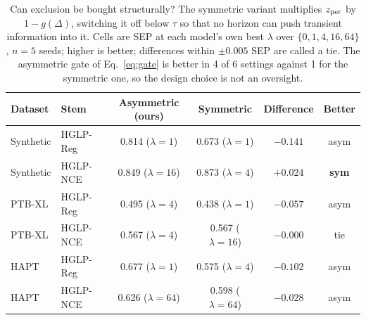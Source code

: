 \begin{table}[H]
\caption{Can exclusion be bought structurally? The symmetric variant multiplies
$z_{\mathrm{per}}$ by $1-g(\Delta)$, switching it off below $\tau$ so that no horizon can push
transient information into it. Cells are SEP at each model's own best $\lambda$ over
$\{0,1,4,16,64\}$, $n=5$ seeds; higher is better; differences within $\pm0.005$ SEP
are called a tie. The asymmetric gate of Eq.~\ref{eq:gate} is better in 4 of
6 settings against 1 for the symmetric one, so the design choice is not
an oversight.}
\label{tab:gatesym}
\centering
\small
\begin{tabular}{llcccc}
\hline
Dataset & Stem & Asymmetric (ours) & Symmetric & Difference & Better \\
\hline
Synthetic & HGLP-Reg & 0.814 ($\lambda=1$) & 0.673 ($\lambda=1$) & $-0.141$ & asym \\
Synthetic & HGLP-NCE & 0.849 ($\lambda=16$) & 0.873 ($\lambda=4$) & $+0.024$ & \textbf{sym} \\
PTB-XL & HGLP-Reg & 0.495 ($\lambda=4$) & 0.438 ($\lambda=1$) & $-0.057$ & asym \\
PTB-XL & HGLP-NCE & 0.567 ($\lambda=4$) & 0.567 ($\lambda=16$) & $-0.000$ & tie \\
HAPT & HGLP-Reg & 0.677 ($\lambda=1$) & 0.575 ($\lambda=4$) & $-0.102$ & asym \\
HAPT & HGLP-NCE & 0.626 ($\lambda=64$) & 0.598 ($\lambda=64$) & $-0.028$ & asym \\
\hline
\end{tabular}
\end{table}
